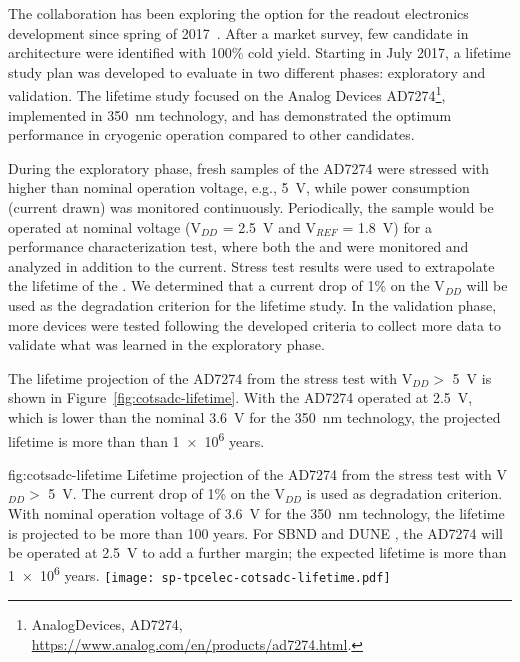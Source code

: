 The  collaboration has been exploring the   option 
for the  readout electronics development since spring of 
2017~\cite{Chen:2018zic}. After a market survey, few candidate  
in  architecture were identified with 100\% cold yield. Starting in %
July 2017, a lifetime study plan was developed to evaluate  
 in two different phases: exploratory and validation. The 
lifetime study focused on the Analog Devices AD7274\footnote{AnalogDevices, AD7274\texttrademark{}, \url{https://www.analog.com/en/products/ad7274.html}.},
implemented in  \SI{350}{nm}  technology, and has demonstrated  %
the optimum performance in cryogenic operation compared to other candidates. 

During the exploratory phase, fresh samples of the   
AD7274 were stressed with higher than nominal operation voltage, e.g., 
\SI{5}{V}, while power consumption (current drawn) was monitored continuously. 
Periodically, the sample would be operated at nominal voltage (V$_{DD}$ = \SI{2.5}{V} 
and V$_{REF}$ = \SI{1.8}{V}) for a performance characterization test, where 
both the  and  were monitored and analyzed in addition 
to the current. %
Stress test results were used to extrapolate the 
lifetime of the  . We determined that a current drop 
of \num{1}\% on the V$_{DD}$ will be used as the degradation criterion for the lifetime 
study. In the validation phase, more devices were tested following the developed 
criteria to collect more data to validate what was learned in the exploratory phase.

The lifetime projection of the AD7274  from the stress 
test with V$_{DD} >$ \SI{5}{V} is shown in Figure~\ref{fig:cotsadc-lifetime}. 
With the AD7274 operated at \SI{2.5}{V}, which is lower than the nominal 
\SI{3.6}{V} for the \SI{350}{nm}  technology, the projected lifetime 
is more than than \num{1e6} years.

\begin{dunefigure}
{fig:cotsadc-lifetime}
{Lifetime projection of the   AD7274 from the stress test 
with V$_{DD} >$ \SI{5}{V}. The current drop of 1\% on the V$_{DD}$ is used as 
degradation criterion. With nominal operation voltage of \SI{3.6}{V} for the 
\SI{350}{nm}  technology, the lifetime is projected to be more 
than 100 years. For SBND and DUNE , the AD7274 will be operated at 
\SI{2.5}{V} to add a further margin; the expected lifetime is more 
than \num{1e6} years.}
\texttt{[image: sp-tpcelec-cotsadc-lifetime.pdf]}
\end{dunefigure}

